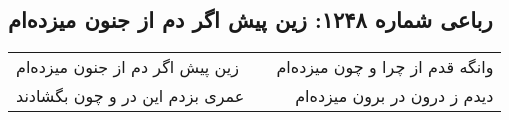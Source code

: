 \begin{center}
\section*{رباعی شماره ۱۲۴۸: زین پیش اگر دم از جنون میزده‌ام}
\label{sec:1248}
\begin{longtable}{l p{0.5cm} r}
زین پیش اگر دم از جنون میزده‌ام
&&
وانگه قدم از چرا و چون میزده‌ام
\\
عمری بزدم این در و چون بگشادند
&&
دیدم ز درون در برون میزده‌ام
\\
\end{longtable}
\end{center}
